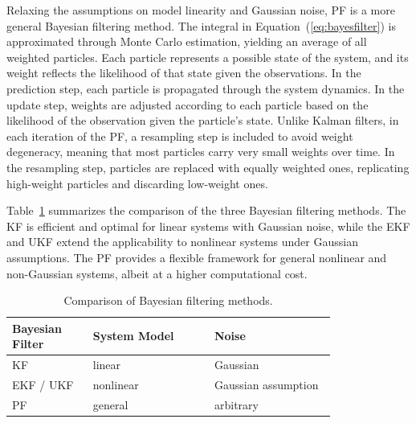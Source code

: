 Relaxing the assumptions on model linearity and Gaussian noise, \ac{PF} \citep{pf1993, Elfring2021-xf} is a more general Bayesian filtering method. The integral in Equation~(\ref{eq:bayesfilter}) is approximated through Monte Carlo estimation, yielding an average of all weighted particles. Each particle represents a possible state of the system, and its weight reflects the likelihood of that state given the observations. In the prediction step, each particle is propagated through the system dynamics. In the update step, weights are adjusted according to each particle based on the likelihood of the observation given the particle's state. Unlike Kalman filters, in each iteration of the \ac{PF}, a resampling step is included to avoid weight degeneracy, meaning that most particles carry very small weights over time. In the resampling step, particles are replaced with equally weighted ones, replicating high-weight particles and discarding low-weight ones.

Table~\ref{tab:bayesian-filters} summarizes the comparison of the three Bayesian filtering methods. The \ac{KF} is efficient and optimal for linear systems with Gaussian noise, while the \ac{EKF} and \ac{UKF} extend the applicability to nonlinear systems under Gaussian assumptions. The \ac{PF} provides a flexible framework for general nonlinear and non-Gaussian systems, albeit at a higher computational cost.

\begin{table}[htbp]
    \centering
    \caption{Comparison of Bayesian filtering methods.}
    \label{tab:bayesian-filters}
    \begin{tabular}{p{0.2\linewidth}p{0.3\linewidth}p{0.3\linewidth}}
        \hline
        Bayesian Filter & System Model & Noise  \\
        \hline
        \ac{KF} & linear & Gaussian  \\
        \ac{EKF} / \ac{UKF} & nonlinear & Gaussian assumption \\
        \ac{PF} & general & arbitrary \\
        \hline
    \end{tabular}
\end{table}


